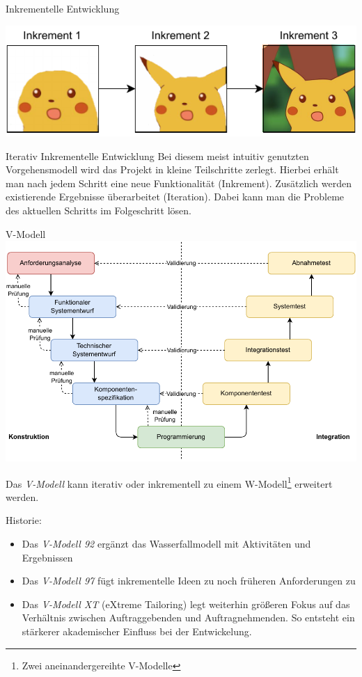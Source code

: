 \begin{example}{Inkrementelle Entwicklung}
    \begin{center}
        \includegraphics{includes/figures/example_incremental_development.pdf}
    \end{center}
\end{example}

\begin{defi}{Iterativ Inkrementelle Entwicklung}
    Bei diesem meist intuitiv genutzten Vorgehensmodell wird das Projekt in kleine Teilschritte zerlegt.
    Hierbei erhält man nach jedem Schritt eine neue Funktionalität (Inkrement).
    Zusätzlich werden existierende Ergebnisse überarbeitet (Iteration).
    Dabei kann man die Probleme des aktuellen Schritts im Folgeschritt lösen.
\end{defi}

\begin{defi}{V-Modell}
    \includegraphics[width=\textwidth]{includes/figures/defi_v_model.pdf}

    Das \emph{V-Modell} kann iterativ oder inkrementell zu einem W-Modell\footnote{Zwei aneinandergereihte V-Modelle} erweitert werden.

    Historie:
    \begin{itemize}
        \item Das \emph{V-Modell 92} ergänzt das Wasserfallmodell mit Aktivitäten und Ergebnissen
        \item Das \emph{V-Modell 97} fügt inkrementelle Ideen zu noch früheren Anforderungen zu
        \item Das \emph{V-Modell XT} (eXtreme Tailoring) legt weiterhin größeren Fokus auf das Verhältnis zwischen Auftraggebenden und Auftragnehmenden.
              So entsteht ein stärkerer akademischer Einfluss bei der Entwickelung.
    \end{itemize}
\end{defi}

